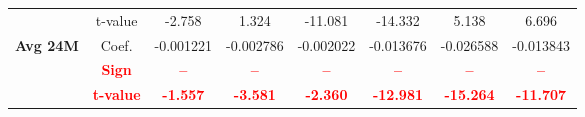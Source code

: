 \documentclass[11pt,english,a4paper,hidelinks]{book}
\begin{document}
\begin{table}[H]
\begin{tabular}{lccccccc}
            & t-value & -2.758    & 1.324     & -11.081   & -14.332   & 5.138     & 6.696     \\
        \cmidrule{1-8}
        \multirow{3}{*}{\textbf{Avg 24M}}
            & Coef.   & -0.001221 & -0.002786 & -0.002022 & -0.013676 & -0.026588 & -0.013843 \\
            & \textbf{\textcolor{red}{Sign}}    & \textbf{\textcolor{red}{–}}         & \textbf{\textcolor{red}{–}}         & \textbf{\textcolor{red}{–}}         & \textbf{\textcolor{red}{–}}         & \textbf{\textcolor{red}{–}}         & \textbf{\textcolor{red}{–}}         \\
            & \textbf{\textcolor{red}{t-value}} & \textbf{\textcolor{red}{-1.557}}    & \textbf{\textcolor{red}{-3.581}}    & \textbf{\textcolor{red}{-2.360}}    & \textbf{\textcolor{red}{-12.981}}   & \textbf{\textcolor{red}{-15.264}}   & \textbf{\textcolor{red}{-11.707}}   \\
        \bottomrule
    \end{tabular}
    \label{tab:asia_oceania_value_consistency}
\end{table}


\end{document}
